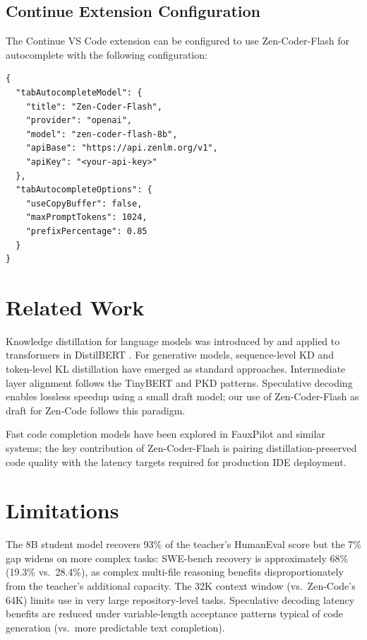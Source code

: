 \documentclass[11pt,a4paper]{article}
\begin{document}
\subsection{Continue Extension Configuration}

The Continue VS Code extension can be configured to use Zen-Coder-Flash for autocomplete
with the following configuration:

\begin{lstlisting}[language={},caption={Continue config.json for Zen-Coder-Flash.}]
{
  "tabAutocompleteModel": {
    "title": "Zen-Coder-Flash",
    "provider": "openai",
    "model": "zen-coder-flash-8b",
    "apiBase": "https://api.zenlm.org/v1",
    "apiKey": "<your-api-key>"
  },
  "tabAutocompleteOptions": {
    "useCopyBuffer": false,
    "maxPromptTokens": 1024,
    "prefixPercentage": 0.85
  }
}
\end{lstlisting}

\section{Related Work}

Knowledge distillation for language models was introduced by \cite{hinton2015distilling}
and applied to transformers in DistilBERT \cite{sanh2019distilbert}. For generative models,
sequence-level KD \cite{kim2016seq} and token-level KL distillation \cite{gu2024minillm}
have emerged as standard approaches. Intermediate layer alignment follows the TinyBERT
\cite{jiao2020tinybert} and PKD \cite{sun2019patient} patterns. Speculative decoding
\cite{leviathan2023speculative, chen2023accelerating} enables lossless speedup using a small
draft model; our use of Zen-Coder-Flash as draft for Zen-Code follows this paradigm.

Fast code completion models have been explored in FauxPilot and similar systems; the key
contribution of Zen-Coder-Flash is pairing distillation-preserved code quality with the
latency targets required for production IDE deployment.

\section{Limitations}

The 8B student model recovers 93\% of the teacher's HumanEval score but the 7\% gap widens
on more complex tasks: SWE-bench recovery is approximately 68\% (19.3\% vs.\ 28.4\%), as
complex multi-file reasoning benefits disproportionately from the teacher's additional capacity.
The 32K context window (vs.\ Zen-Code's 64K) limits use in very large repository-level
tasks. Speculative decoding latency benefits are reduced under variable-length acceptance
patterns typical of code generation (vs.\ more predictable text completion).
\end{document}
